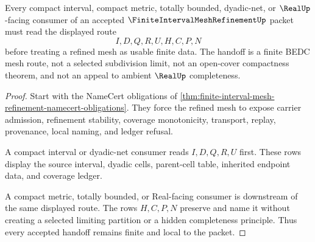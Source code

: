 \begin{theorem}
\label{thm:finite-interval-mesh-refinement-compact-handoff}
Every compact interval, compact metric, totally bounded, dyadic-net, or $\RealUp$-facing consumer of an accepted $\FiniteIntervalMeshRefinementUp$ packet must read the displayed route
$$
I,D,Q,R,U,H,C,P,N
$$
before treating a refined mesh as usable finite data. The handoff is a finite BEDC mesh route, not a selected subdivision limit, not an open-cover compactness theorem, and not an appeal to ambient $\RealUp$ completeness.
\end{theorem}
\begin{proof}
Start with the NameCert obligations of \autoref{thm:finite-interval-mesh-refinement-namecert-obligations}. They force the refined mesh to expose carrier admission, refinement stability, coverage monotonicity, transport, replay, provenance, local naming, and ledger refusal.

A compact interval or dyadic-net consumer reads $I,D,Q,R,U$ first. These rows display the source interval, dyadic cells, parent-cell table, inherited endpoint data, and coverage ledger.

A compact metric, totally bounded, or Real-facing consumer is downstream of the same displayed route. The rows $H,C,P,N$ preserve and name it without creating a selected limiting partition or a hidden completeness principle. Thus every accepted handoff remains finite and local to the packet.
\end{proof}




